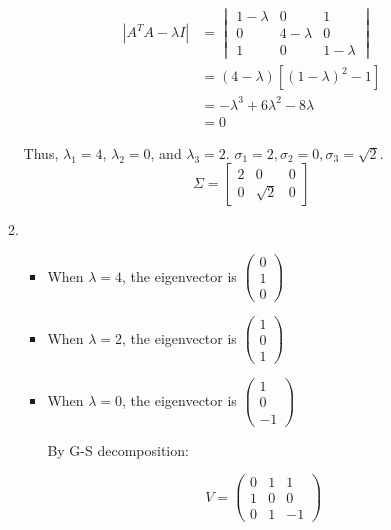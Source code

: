 \documentclass[11pt]{article} %
\begin{document}
\begin{enumerate}
\begin{enumerate}
\begin{align*}
	|A^TA-\lambda I|&=\begin{vmatrix}
		1-\lambda&0&1\\
		0&4-\lambda&0\\
		1&0&1-\lambda
	\end{vmatrix}\\
	&=(4-\lambda)[(1-\lambda)^2-1]\\
	&=-\lambda^3+6\lambda^2-8\lambda\\
	&=0
\end{align*}

Thus,  $\lambda_1=4$, $\lambda_2=0$, and $\lambda_3=2$. $\sigma_1=2, \sigma_2=0, \sigma_3=\sqrt{2}$. 
$$\Sigma=\begin{bmatrix}
	2&0&0\\0&\sqrt{2}&0
\end{bmatrix}$$
\item
\begin{itemize}
	\item When $\lambda=4$, the eigenvector is $\begin{pmatrix}
		0\\1\\0
	\end{pmatrix}$
\item When $\lambda=2$, the eigenvector is $\begin{pmatrix}
	1\\0\\1
\end{pmatrix}$
\item When $\lambda=0$, the eigenvector is $\begin{pmatrix}
	1\\0\\-1
\end{pmatrix}$
 
 By G-S decomposition:
 
$$V=\begin{pmatrix}
	0&1&1\\1&0&0\\0&1&-1
\end{pmatrix}$$






\end{itemize}
\end{enumerate}
\end{enumerate}
\end{document}
